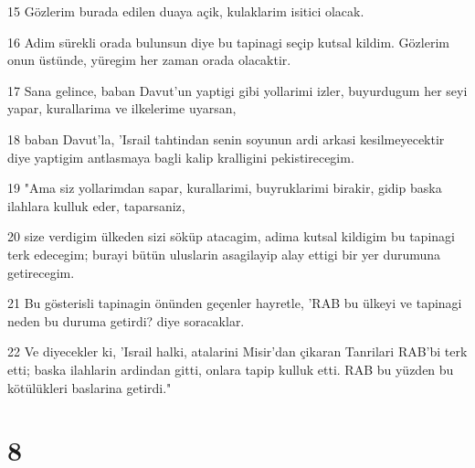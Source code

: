 \par 15 Gözlerim burada edilen duaya açik, kulaklarim isitici olacak.
\par 16 Adim sürekli orada bulunsun diye bu tapinagi seçip kutsal kildim. Gözlerim onun üstünde, yüregim her zaman orada olacaktir.
\par 17 Sana gelince, baban Davut'un yaptigi gibi yollarimi izler, buyurdugum her seyi yapar, kurallarima ve ilkelerime uyarsan,
\par 18 baban Davut'la, 'Israil tahtindan senin soyunun ardi arkasi kesilmeyecektir diye yaptigim antlasmaya bagli kalip kralligini pekistirecegim.
\par 19 "Ama siz yollarimdan sapar, kurallarimi, buyruklarimi birakir, gidip baska ilahlara kulluk eder, taparsaniz,
\par 20 size verdigim ülkeden sizi söküp atacagim, adima kutsal kildigim bu tapinagi terk edecegim; burayi bütün uluslarin asagilayip alay ettigi bir yer durumuna getirecegim.
\par 21 Bu gösterisli tapinagin önünden geçenler hayretle, 'RAB bu ülkeyi ve tapinagi neden bu duruma getirdi? diye soracaklar.
\par 22 Ve diyecekler ki, 'Israil halki, atalarini Misir'dan çikaran Tanrilari RAB'bi terk etti; baska ilahlarin ardindan gitti, onlara tapip kulluk etti. RAB bu yüzden bu kötülükleri baslarina getirdi."

\chapter{8}

